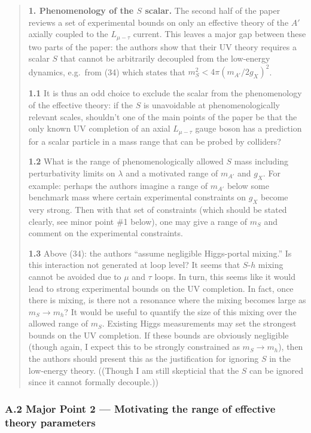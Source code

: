 \documentclass[
]{article}
\begin{document}
\begin{quote}
\textbf{1. Phenomenology of the \(S\) scalar.} The second half of the
paper reviews a set of experimental bounds on only an effective theory
of the \(A'\) axially coupled to the \(L_{\mu-\tau}\) current. This
leaves a major gap between these two parts of the paper: the authors
show that their UV theory requires a scalar \(S\) that cannot be
arbitrarily decoupled from the low-energy dynamics, e.g.~from (34) which
states that \(m_S^2<4\pi(m_{A'}/2g_X)^2\).

\textbf{1.1} It is thus an odd choice to exclude the scalar from the
phenomenology of the effective theory: if the \(S\) is unavoidable at
phenomenologically relevant scales, shouldn't one of the main points of
the paper be that the only known UV completion of an axial
\(L_{\mu-\tau}\) gauge boson has a prediction for a scalar particle in a
mass range that can be probed by colliders?

\textbf{1.2} What is the range of phenomenologically allowed \(S\) mass
including perturbativity limits on \(\lambda\) and a motivated range of
\(m_{A'}\) and \(g_X\). For example: perhaps the authors imagine a range
of \(m_{A'}\) below some benchmark mass where certain experimental
constraints on \(g_X\) become very strong. Then with that set of
constraints (which should be stated clearly, see minor point \#1 below),
one may give a range of \(m_S\) and comment on the experimental
constraints.

\textbf{1.3} Above (34): the authors ``assume negligible Higgs-portal
mixing.'' Is this interaction not generated at loop level? It seems that
\(S\)-\(h\) mixing cannot be avoided due to \(\mu\) and \(\tau\) loops.
In turn, this seems like it would lead to strong experimental bounds on
the UV completion. In fact, once there is mixing, is there not a
resonance where the mixing becomes large as \(m_S\to m_h\)? It would be
useful to quantify the size of this mixing over the allowed range of
\(m_S\). Existing Higgs measurements may set the strongest bounds on the
UV completion. If these bounds are obviously negligible (though again, I
expect this to be strongly constrained as \(m_S\to m_h\)), then the
authors should present this as the justification for ignoring \(S\) in
the low-energy theory. ((Though I am still skepticial that the \(S\) can
be ignored since it cannot formally decouple.))
\end{quote}

\subsubsection{A.2 Major Point 2 --- Motivating the range of effective
theory
parameters}\label{a.2-major-point-2-motivating-the-range-of-effective-theory-parameters}
\end{document}
